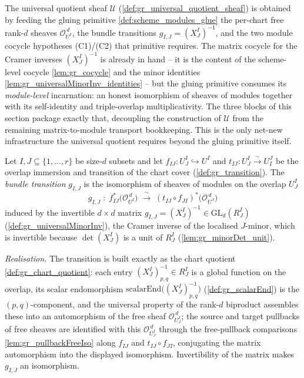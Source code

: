 The universal quotient sheaf \(\mathcal{U}\) (\cref{def:gr_universal_quotient_sheaf}) is
obtained by feeding the gluing primitive \cref{def:scheme_modules_glue} the per-chart free
rank-\(d\) sheaves \(\mathcal{O}_{U^I}^{\,d}\), the bundle transitions
\(g_{I,J} = (X^I_J)^{-1}\), and the two module cocycle hypotheses (C1)/(C2) that primitive
requires. The matrix cocycle for the Cramer inverses \((X^I_J)^{-1}\) is already in hand --
it is the content of the scheme-level cocycle \cref{lem:gr_cocycle} and the minor identities
\cref{lem:gr_universalMinorInv_identities} -- but the gluing primitive consumes its
\emph{module-level} incarnation: an honest isomorphism of sheaves of modules together with
its self-identity and triple-overlap multiplicativity. The three blocks of this section
package exactly that, decoupling the construction of \(\mathcal{U}\) from the remaining
matrix-to-module transport bookkeeping. This is the only net-new infrastructure the
universal quotient requires beyond the gluing primitive itself.


\begin{definition}
  \label{def:gr_bundleTransition}
  Let \(I, J \subseteq \{1,\dots,r\}\) be size-\(d\) subsets and let
  \(f_{IJ} : U^I_J \hookrightarrow U^I\) and \(t_{IJ} : U^I_J \xrightarrow{\sim} U^J_I\) be
  the overlap immersion and transition of the chart cover (\cref{def:gr_transition}). The
  \emph{bundle transition} \(g_{I,J}\) is the isomorphism of sheaves of modules on the
  overlap \(U^I_J\)
  \[
    g_{I,J} \;:\;
      f_{IJ}^{*}\bigl(\mathcal{O}_{U^I}^{\,d}\bigr)
      \;\xrightarrow{\ \sim\ }\;
      (t_{IJ} \circ f_{JI})^{*}\bigl(\mathcal{O}_{U^J}^{\,d}\bigr)
  \]
  induced by the invertible \(d \times d\) matrix
  \(g_{I,J} = (X^I_J)^{-1} \in \mathrm{GL}_d(R^I_J)\) (\cref{def:gr_universalMinorInv}),
  the Cramer inverse of the localised \(J\)-minor, which is invertible because
  \(\det(X^I_J)\) is a unit of \(R^I_J\) (\cref{lem:gr_minorDet_unit}).

  \emph{Realisation.} The transition is built exactly as the chart quotient
  \cref{def:gr_chart_quotient}: each entry \((X^I_J)^{-1}_{p,q} \in R^I_J\) is a global
  function on the overlap, its scalar endomorphism
  \(\mathrm{scalarEnd}\bigl((X^I_J)^{-1}_{p,q}\bigr)\) (\cref{def:gr_scalarEnd}) is the
  \((p,q)\)-component, and the universal property of the rank-\(d\) biproduct assembles
  these into an automorphism of the free sheaf \(\mathcal{O}_{U^I_J}^{\,d}\); the
  source and target pullbacks of free sheaves are identified with this
  \(\mathcal{O}_{U^I_J}^{\,d}\) through the free-pullback comparisons
  \cref{lem:gr_pullbackFreeIso} along \(f_{IJ}\) and \(t_{IJ} \circ f_{JI}\), conjugating
  the matrix automorphism into the displayed isomorphism. Invertibility of the matrix makes
  \(g_{I,J}\) an isomorphism.
\end{definition}

